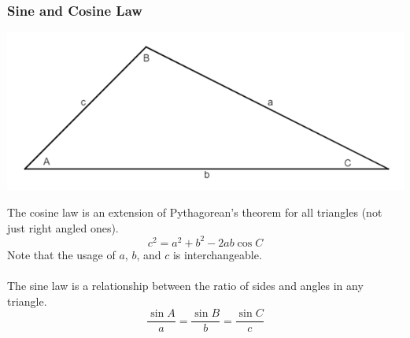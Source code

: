 \subsubsection{Sine and Cosine Law}
\centerline{\includegraphics[scale=0.7]{Images/FundamentalsPictures/SineLawTriangle.png}}
The cosine law is an extension of Pythagorean's theorem for all triangles (not just right angled ones).
$$c^2=a^2+b^2-2ab\cos C$$
Note that the usage of $a$, $b$, and $c$ is interchangeable.\\
\\
The sine law is a relationship between the ratio of sides and angles in any triangle.
$$\frac{\sin A}{a}=\frac{\sin B}{b}=\frac{\sin C}{c}$$